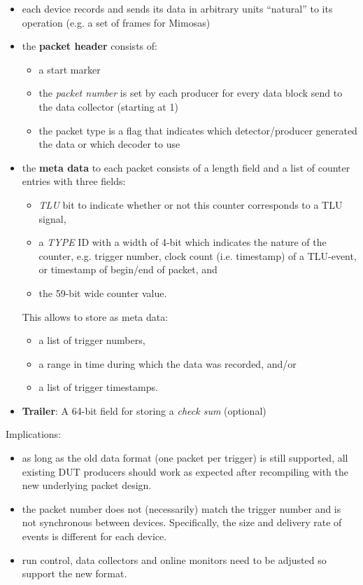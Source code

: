 \documentclass[paper=a4, fontsize=11pt]{scrartcl}	%
\numberwithin{equation}{section}		%
\numberwithin{figure}{section}			%
\numberwithin{table}{section}				%
\begin{document}
\begin{itemize}
\item each device records and sends its data in arbitrary units ``natural'' to
  its operation (e.g. a set of frames for Mimosas)

\item the \textbf{packet header} consists of:
  \begin{itemize}
  \item a start marker
  \item the \emph{packet number} is set by each producer for
    every data block send to the data collector (starting at 1)
  \item the packet type is a flag that indicates which
    detector/producer generated the data or which decoder to use
  \end{itemize}
\item the \textbf{meta data} to each packet consists of a length field and a
  list of counter entries with three fields: 
  \begin{itemize}
  \item \emph{TLU} bit to indicate whether or not this counter
    corresponds to a TLU signal,
  \item a \emph{TYPE} ID with a width of 4-bit which indicates the nature of the counter,
    e.g. trigger number, clock count (i.e. timestamp) of a TLU-event, or
    timestamp of begin/end of packet, and
  \item the 59-bit wide counter value.
  \end{itemize}
  This allows to store as meta data:
  \begin{itemize}
  \item a list of trigger numbers,
  \item a range in time during which the data was recorded, and/or
  \item a list of trigger timestamps.
  \end{itemize}
\item \textbf{Trailer}: A 64-bit field for storing a \emph{check sum} (optional)
  
\end{itemize}

Implications:
\begin{itemize}
\item as long as the old data format (one packet per trigger) is
  still supported, all existing DUT producers should work as expected
  after recompiling with the new underlying packet design.
\item the packet number does not (necessarily) match the trigger number
  and is not synchronous between devices. Specifically, the size and delivery rate
  of events is different for each device.
\item run control, data collectors and online monitors need to be adjusted so
  support the new format.
\end{itemize}
\end{document}
